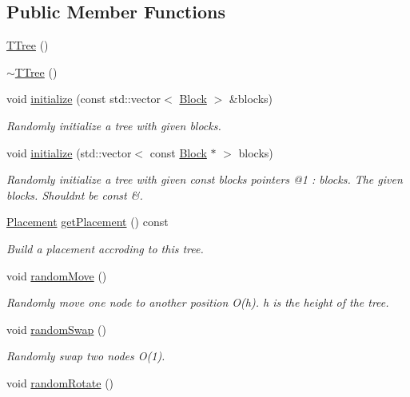 \subsection*{Public Member Functions}
\begin{DoxyCompactItemize}
\item 
\hyperlink{classTTree_a86fa5aaf9e0e661ab3711fc70c99070e}{T\+Tree} ()
\item 
\hyperlink{classTTree_a392d80512f4336cdc8f60eee4377e668}{$\sim$\+T\+Tree} ()
\item 
void \hyperlink{classTTree_a7be152bf003a3b7a41a0d2f2b8a60dcb}{initialize} (const std\+::vector$<$ \hyperlink{structBlock}{Block} $>$ \&blocks)
\begin{DoxyCompactList}\small\item\em Randomly initialize a tree with given blocks. \end{DoxyCompactList}\item 
void \hyperlink{classTTree_a39407b0d5bb0419d5930a264f909d240}{initialize} (std\+::vector$<$ const \hyperlink{structBlock}{Block} $\ast$ $>$ blocks)
\begin{DoxyCompactList}\small\item\em Randomly initialize a tree with given const blocks pointers @1 \+: blocks. The given blocks. Shouldn\textquotesingle{}t be const \&. \end{DoxyCompactList}\item 
\hyperlink{classPlacement}{Placement} \hyperlink{classTTree_a7e34e70567be7961d4a5683010746aae}{get\+Placement} () const 
\begin{DoxyCompactList}\small\item\em Build a placement accroding to this tree. \end{DoxyCompactList}\item 
void \hyperlink{classTTree_a0b4e068faf77b43c5cb00a4e61a1c130}{random\+Move} ()
\begin{DoxyCompactList}\small\item\em Randomly move one node to another position O(h). h is the height of the tree. \end{DoxyCompactList}\item 
void \hyperlink{classTTree_aa5aab663511558247357bd9031f7f523}{random\+Swap} ()
\begin{DoxyCompactList}\small\item\em Randomly swap two nodes O(1). \end{DoxyCompactList}\item 
void \hyperlink{classTTree_a72310af81f796797a623145656028bfc}{random\+Rotate} ()

\end{DoxyCompactItemize}
